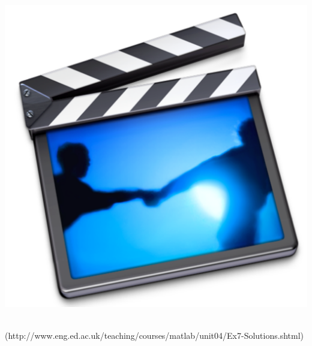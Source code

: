 {\begin{minipage}{\linewidth}
\begin{minipage}{6mm}
\includegraphics[scale=0.03]{Graphics/General/screencast_icon}
\end{minipage}
\href{http://www.eng.ed.ac.uk/teaching/courses/matlab/unit04/Ex7-Solutions.shtml}{}\\
(http://www.eng.ed.ac.uk/teaching/courses/matlab/unit04/Ex7-Solutions.shtml)
\end{minipage}%
}\\
\addtolength{\parindent}{4mm}

